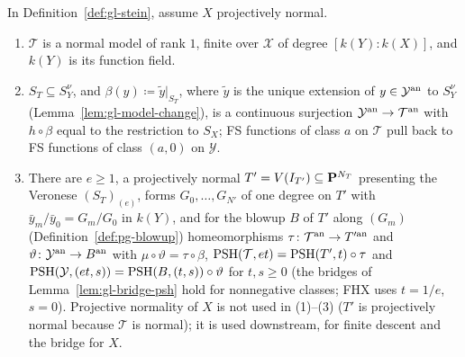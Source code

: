 \begin{lemma}\label{lem:gl-stein}
\leanok
{}
In Definition~\ref{def:gl-stein}, assume $X$ projectively normal.
\begin{enumerate}
\item $\mathcal T$ is a normal model of rank $1$, finite over $\mathcal X$ of degree $[k(Y):k(X)]$, and $k(Y)$ is its function field.
\item $S_T\subseteq S_Y^\nu$, and $\beta(y)\coloneqq\tilde y|_{S_T}$, where $\tilde y$ is the unique extension of $y\in\mathcal Y^{\mathrm{an}}$ to $S_Y^\nu$
(Lemma~\ref{lem:gl-model-change}), is a continuous surjection $\mathcal Y^{\mathrm{an}}\to\mathcal T^{\mathrm{an}}$ with $h\circ\beta$ equal to the restriction to $S_X$; FS
functions of class $a$ on $\mathcal T$ pull back to FS functions of class $(a,0)$ on $\mathcal Y$.
\item There are $e\ge1$, a projectively normal $T'=V(I_{T'})\subseteq\mathbf{P}^{N_T}$ presenting the Veronese $(S_T)_{(e)}$, forms $G_0,\dots,G_{N'}$ of one
degree on $T'$ with $\bar y_m/\bar y_0=G_m/G_0$ in $k(Y)$, and for the blowup $B$ of $T'$ along $(G_m)$ (Definition~\ref{def:pg-blowup}) homeomorphisms
$\tau\colon\mathcal T^{\mathrm{an}}\to T'^{\mathrm{an}}$ and $\vartheta\colon\mathcal Y^{\mathrm{an}}\to B^{\mathrm{an}}$ with $\mu\circ\vartheta=\tau\circ\beta$, $\operatorname{PSH}(\mathcal T,et)=\operatorname{PSH}(T',t)\circ\tau$ and
$\operatorname{PSH}(\mathcal Y,(et,s))=\operatorname{PSH}(B,(t,s))\circ\vartheta$ for $t,s\ge0$ (the bridges of Lemma~\ref{lem:gl-bridge-psh} hold for nonnegative classes; FHX uses $t=1/e$, $s=0$).
Projective normality of $X$ is not used in (1)--(3) ($T'$ is projectively normal because $\mathcal T$ is normal); it is used downstream, for finite descent and the bridge for $X$.
\end{enumerate}
\end{lemma}

